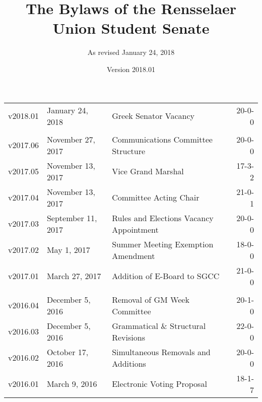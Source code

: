 \documentclass{bylaws}
\title{The Bylaws of the Rensselaer Union Student Senate}
\author{As revised January 24, 2018}
\date{\small Version 2018.01}
\begin{document}
\thispagestyle{empty}
\maketitle



























\newpage


\begin{center}
    \begin{tabular}{lllr}
    v2018.01 & January 24, 2018   & Greek Senator Vacancy                   & 20-0-0\\ \\

    v2017.06 & November 27, 2017  & Communications Committee Structure      & 20-0-0\\
    v2017.05 & November 13, 2017  & Vice Grand Marshal                      & 17-3-2\\
    v2017.04 & November 13, 2017  & Committee Acting Chair                  & 21-0-1\\
    v2017.03 & September 11, 2017 & Rules and Elections Vacancy Appointment & 20-0-0\\
    v2017.02 & May 1, 2017        & Summer Meeting Exemption Amendment      & 18-0-0 \\
    v2017.01 & March 27, 2017     & Addition of E-Board to SGCC             & 21-0-0 \\ \\

    v2016.04 & December 5, 2016   & Removal of GM Week Committee            & 20-1-0 \\
    v2016.03 & December 5, 2016   & Grammatical \& Structural Revisions     & 22-0-0 \\
    v2016.02 & October 17, 2016   & Simultaneous Removals and Additions     & 20-0-0 \\
    v2016.01 & March 9, 2016      & Electronic Voting Proposal              & 18-1-7 \\
    \end{tabular}
\end{center}
\end{document}
